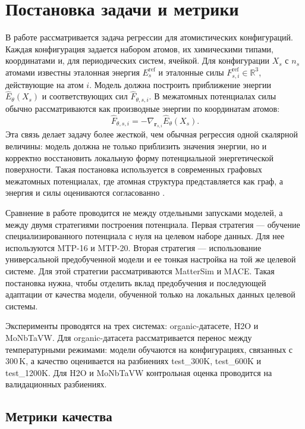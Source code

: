\section{Постановка задачи и метрики}

В работе рассматривается задача регрессии для атомистических конфигураций. Каждая конфигурация задается набором атомов, их химическими типами, координатами и, для периодических систем, ячейкой. Для конфигурации $X_s$ с $n_s$ атомами известны эталонная энергия $E_s^{\mathrm{ref}}$ и эталонные силы $F_{s,i}^{\mathrm{ref}} \in \mathbb{R}^3$, действующие на атом $i$. Модель должна построить приближение энергии $\widehat{E}_\theta(X_s)$ и соответствующих сил $\widehat{F}_{\theta,s,i}$. В межатомных потенциалах силы обычно рассматриваются как производные энергии по координатам атомов:
\begin{equation}
\widehat{F}_{\theta,s,i}
=
- \nabla_{\mathbf{r}_{s,i}} \widehat{E}_\theta(X_s).
\label{eq:forces_from_energy}
\end{equation}
Эта связь делает задачу более жесткой, чем обычная регрессия одной скалярной величины: модель должна не только приблизить значения энергии, но и корректно восстановить локальную форму потенциальной энергетической поверхности. Такая постановка используется в современных графовых межатомных потенциалах, где атомная структура представляется как граф, а энергия и силы оцениваются согласованно \cite{m3gnet2022,mace2022}.

Сравнение в работе проводится не между отдельными запусками моделей, а между двумя стратегиями построения потенциала. Первая стратегия — обучение специализированного потенциала с нуля на целевом наборе данных. Для нее используются MTP-16 и MTP-20. Вторая стратегия — использование универсальной предобученной модели и ее тонкая настройка на той же целевой системе. Для этой стратегии рассматриваются MatterSim и MACE. Такая постановка нужна, чтобы отделить вклад предобучения и последующей адаптации от качества модели, обученной только на локальных данных целевой системы.

Эксперименты проводятся на трех системах: organic-датасете, H2O и MoNbTaVW. Для organic-датасета рассматривается перенос между температурными режимами: модели обучаются на конфигурациях, связанных с $300\,\mathrm{K}$, а качество оценивается на разбиениях test\_300K, test\_600K и test\_1200K. Для H2O и MoNbTaVW контрольная оценка проводится на валидационных разбиениях.

\subsection{Метрики качества}

